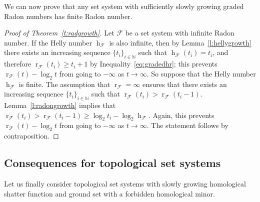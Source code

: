 \documentclass[a4paper,UKenglish,thm-restate]{article}
\newcommand{\N}{\mathbb{N}}
\newcommand{\F}{\mathcal{F}}
\DeclareMathOperator{\h}{h}
\DeclareMathOperator{\rad}{r}
\begin{document}
We can now prove that any set system with sufficiently slowly growing graded Radon numbers has finite Radon number.

\begin{proof}[Proof of Theorem~\ref{t:radgrowth}]
  Let $\F$ be a set system with infinite Radon number. If the Helly number $\h_\F$ is also infinite, then by Lemma~\ref{l:hellygrowth} there exists an increasing sequence $\{t_i\}_{i \in \N}$ such that $\h_\F(t_i) = t_i$, and therefore $\rad_\F(t_i) \ge t_i+1$ by Inequality~\eqref{eq:gradedhr}; this prevents $\rad_\F(t)-\log_2 t$ from going to $-\infty$ as $t \to \infty$. So suppose that the Helly number $\h_\F$ is finite. The assumption that $\rad_\F=\infty$ ensures that there exists an increasing sequence $\{t_i\}_{i \in \N}$ such that $\rad_\F(t_i) > \rad_\F(t_i-1)$. Lemma~\ref{l:radongrowth} implies that $\rad_\F(t_i) > \rad_\F(t_i-1) \ge \log_2 t_i - \log_2 \h_\F$. Again, this prevents $\rad_\F(t)-\log_2 t$ from going to $-\infty$ as $t \to \infty$. The statement follows by contraposition.
\end{proof}


\subsection{Consequences for topological set systems}

Let us finally consider topological set systems with slowly growing homological shatter function and ground set with a forbidden homological minor.
\end{document}
